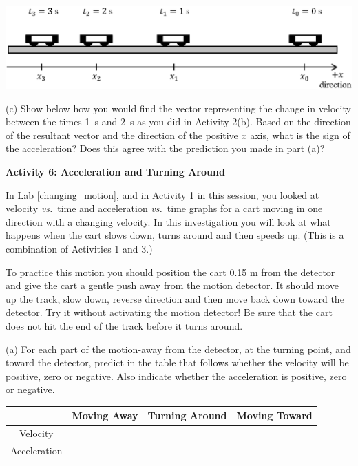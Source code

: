 {\par\centering \includegraphics{slowing/carts_slowing2.eps} \par}

(c) Show below how you would find the vector representing the change in velocity
between the times 1~s and 2~s as you did in Activity 2(b). Based on the 
direction of the resultant vector and the direction of the positive $x$ axis, 
what is the sign of the acceleration? 
Does this agree with the prediction you made in part (a)?
\answerspace{10mm}

\pagebreak[2]
\textbf{Activity 6: Acceleration and Turning Around }

In Lab \ref{changing_motion}, and in Activity 1 in this session, you looked at
velocity \textit{vs.}~time and acceleration \textit{vs.}~time graphs for a cart moving in one
direction with a changing velocity. In this investigation you will look at what
happens when the cart slows down, turns around and then speeds up. (This is a
combination of Activities 1 and 3.)

To practice this motion you should position the cart 0.15 m from the detector
and give the cart a gentle push away from the motion detector. It should move
up the track, slow down, reverse direction and then move back down toward the
detector. Try it without activating the motion detector! Be sure that the cart
does not hit the end of the track before it turns around. 


(a) For each part of the motion-away from the detector, at the turning point,
and toward the detector, predict in the table that follows whether the velocity
will be positive, zero or negative. Also indicate whether the acceleration is
positive, zero or negative.

\vspace{0.3cm}
{\centering \begin{tabular}{|c|c|c|c|}
\hline 
&
Moving Away&
Turning Around&
Moving Toward\\
\hline 
Velocity&
&
&
\\
\hline 
Acceleration&
&
&
\\
\hline 
\end{tabular}\par}
\vspace{0.3cm}

